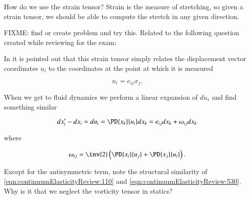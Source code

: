 \begin{Exercise}[
title={Computing stretch in any given direction},
label={problem:strain:todo}
]

How do we use the strain tensor?  Strain is the measure of stretching, so given a strain tensor, we should be able to compute the stretch in any given direction.

FIXME: find or create problem and try this.  Related to the following question created while reviewing for the exam:

In \citep{feynman1963flp:elasticMaterials} it is pointed out that this strain tensor simply relates the displacement vector coordinates $u_i$ to the coordinates at the point at which it is measured

\begin{equation}\label{eqn:continuumElasticityReview:110}
u_i = e_{ij} x_j.
\end{equation}

When we get to fluid dynamics we perform a linear expansion of $du_i$ and find something similar

\begin{equation}\label{eqn:continuumElasticityReview:530}
dx_i' - dx_i = du_i = \PD{x_k}{u_i} dx_k = e_{ij} dx_k + \omega_{ij} dx_k
\end{equation}

where

\begin{equation}\label{eqn:continuumElasticityReview:550}
\omega_{ij} = \inv{2} \left( \PD{x_i}{u_j} +\PD{x_j}{u_i} \right).
\end{equation}

Except for the antisymmetric term, note the structural similarity of \ref{eqn:continuumElasticityReview:110} and \ref{eqn:continuumElasticityReview:530}.  Why is it that we neglect the vorticity tensor in statics?
%
%

\end{Exercise}


